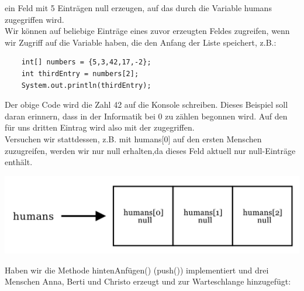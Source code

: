 \documentclass{article}
\begin{document}
ein Feld mit 5 Einträgen null erzeugen, auf das durch die Variable humans zugegriffen wird. \\
Wir können auf beliebige Einträge eines zuvor erzeugten Feldes zugreifen, wenn wir Zugriff auf die Variable haben, die den Anfang der Liste speichert, z.B.:
\begin{verbatim}
    int[] numbers = {5,3,42,17,-2};
    int thirdEntry = numbers[2];
    System.out.println(thirdEntry);
\end{verbatim}

Der obige Code wird die Zahl 42 auf die Konsole schreiben. Dieses Beispiel soll daran erinnern, dass
in der Informatik bei 0 zu zählen begonnen wird. Auf den für uns dritten Eintrag wird also mit der 
 zugegriffen. \\

Versuchen wir stattdessen, z.B. mit humans[0] auf den ersten Menschen zuzugreifen, werden wir nur null erhalten,da dieses Feld aktuell nur null-Einträge enthält. 

\begin{center}
    \includegraphics[scale=0.2]{../media/queue_humans_null.png}
\end{center}

Haben wir die Methode hintenAnfügen() (push()) implementiert und drei Menschen Anna, Berti und Christo 
erzeugt und zur Warteschlange hinzugefügt: 
\end{document}
